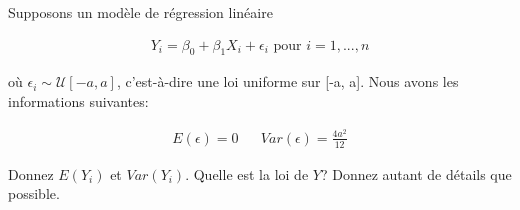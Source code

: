 \begin{questions}
\begin{parts}
\end{parts}



\newpage

\bonusquestion

Supposons un modèle de régression linéaire

\begin{align*}
    Y_i=\beta_0+\beta_1 X_i + \epsilon_i \text{ pour } i = 1,...,n
\end{align*}

où $\epsilon_i \sim \mathcal{U}[-a, a]$, c'est-à-dire une loi uniforme sur [-a, a]. Nous avons les informations suivantes:

 
 \begin{align*}
     E(\epsilon)= 0 & & Var(\epsilon)= \frac{4a^2}{12}
 \end{align*}
 
\begin{parts}
\bonuspart[3] Donnez $E(Y_i)$ et $Var(Y_i)$.
\vspace{3cm}
\bonuspart[3] Quelle est la loi de $Y$? Donnez autant de détails que possible.
\end{parts}


\end{questions}
\newpage


 
